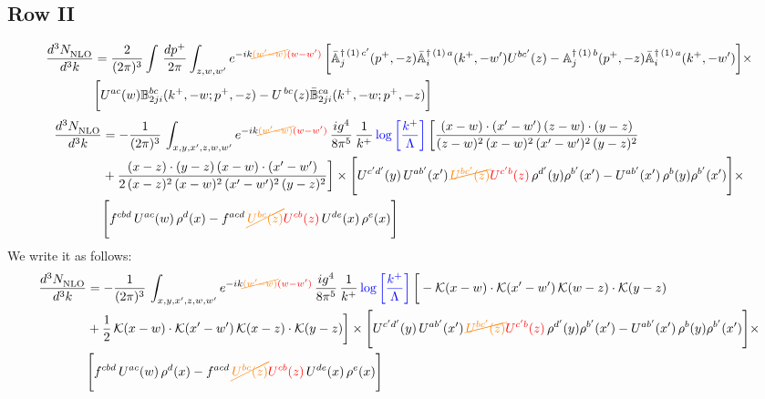 \documentclass[9pt]{article}
\def\mf#1{\mathbb{#1}}
\numberwithin{equation}{section}
\begin{document}
\subsection{Row II}
\begin{align}
    \frac{d^{3}N_{\rm NLO}^{\rm}}{d^{3}k}  & =    \frac{2}{(2\pi)^{3}} \int\, \frac{dp^{+}}{2\pi}\int_{z,w,w^{\prime}} e^{-ik{\color{orange}\cancel{(w^{\prime}-w)}}{\color{red}(w-w^{\prime})}}\,\bigg[\Bar{\mf{A}}^{\dagger\,(1)\, c^{\prime}}_{j}(p^{+},-z)\Bar{\mf{A}}^{\dagger\, (1)\, a}_{i}(k^{+},- w^{\prime})U^{bc^{\prime}}(z) - \mf{A}^{\dagger\, (1)\, b}_{j}(p^{+},- z)\Bar{\mf{A}}^{\dagger\, (1)\, a}_{i}(k^{+},- w^{\prime})\bigg] \times \notag \\ & \bigg[U^{ac}(w) \mf{B}^{bc}_{2ji}(k^{+},-w;p^{+},-z) -U^{\, bc}(z)\Bar{\mf{B}}^{ca}_{2ji}(k^{+},-w; p^{+},-z)\bigg] \nonumber
\end{align}
\begin{align}
 \frac{d^{3}N_{\rm NLO}^{\rm}}{d^{3}k}  & =    -\frac{1}{(2\pi)^{3}}\, \int_{x,y,x',z,w,w^{\prime}} e^{-ik{\color{orange}\cancel{(w^{\prime}-w)}}{\color{red}(w-w^{\prime})}}\,\frac{ig^{4}}{8\pi^{5}}\,\frac{1}{k^{+}}\,{\color{blue}\log{\left[\frac{k^{+}}{\Lambda}\right]}}\,\bigg[\frac{(x-w)\cdot (x'-w')\,(z-w)\cdot (y-z)}{(z-w)^{2}\,(x-w)^{2}\,(x'-w')^{2}\,(y-z)^{2}}\notag \\ & +\frac{(x-z)\cdot (y-z)\,(x-w)\cdot (x'-w')}{2\,(x-z)^{2}\, (x-w)^{2}\,(x'-w')^{2}\,(y-z)^{2}}\bigg]\times\Bigg[U^{c'd'}(y)\,U^{ab'}(x')\,{\color{orange}\cancel{U^{bc'}(z)}}{\color{red}U^{c'b}(z)}\,\rho^{d'}(y)\rho^{b'}(x')-U^{ab'}(x')\,\rho^{b}(y)\rho^{b'}(x')\Bigg]\times\notag \\ & \Bigg[f^{cbd}\,U^{ac}(w)\,\rho^{d}(x)-f^{acd}\, {\color{orange}\cancel{U^{bc}(z)}}{\color{red}U^{cb}(z)}\,U^{de}(x)\,\rho^{e}(x)\Bigg]
\end{align}
We write it as follows:
\begin{align}
 \frac{d^{3}N_{\rm NLO}^{\rm}}{d^{3}k}  & =    -\frac{1}{(2\pi)^{3}}\, \int_{x,y,x',z,w,w^{\prime}} e^{-ik{\color{orange}\cancel{(w^{\prime}-w)}}{\color{red}(w-w^{\prime})}}\,\frac{ig^{4}}{8\pi^{5}}\,\frac{1}{k^{+}}\,{\color{blue}\log{\left[\frac{k^{+}}{\Lambda}\right]}}\,\bigg[-\mathcal{K}(x-w)\cdot \mathcal{K}(x'-w')\, \mathcal{K}(w-z)\cdot \mathcal{K}(y-z)\notag \\ & +\frac{1}{2}\,\mathcal{K}(x-w)\cdot \mathcal{K}(x'-w')\, \mathcal{K}(x-z)\cdot \mathcal{K}(y-z)\bigg]\times\Bigg[U^{c'd'}(y)\,U^{ab'}(x')\,{\color{orange}\cancel{U^{bc'}(z)}}{\color{red}U^{c'b}(z)}\,\rho^{d'}(y)\rho^{b'}(x')-U^{ab'}(x')\,\rho^{b}(y)\rho^{b'}(x')\Bigg]\times\notag \\ & \Bigg[f^{cbd}\,U^{ac}(w)\,\rho^{d}(x)-f^{acd}\, {\color{orange}\cancel{U^{bc}(z)}}{\color{red}U^{cb}(z)}\,U^{de}(x)\,\rho^{e}(x)\Bigg]
\end{align}
\end{document}
